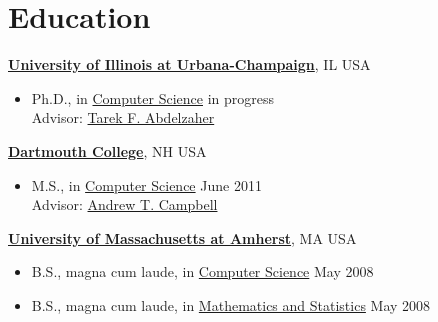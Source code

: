 \section{\sc Education}
{\href{http://www.illinois.edu/}{{\bf University of Illinois at Urbana-Champaign}}}, IL USA
\begin{itemize}
\item Ph.D., in {\href{http://www.cs.illinois.edu/}{Computer Science}} \hfill in progress \\
Advisor: {\href{http://www.cs.uiuc.edu/~zaher/}{Tarek F. Abdelzaher}}
\end{itemize}

{\href{http://www.dartmouth.edu/}{\bf Dartmouth College}}, NH USA
\begin{itemize}
\item M.S., in {\href{http://www.cs.dartmouth.edu/}{Computer Science}} \hfill June 2011 \\
Advisor: {\href{http://www.cs.dartmouth.edu/~campbell}{Andrew T. Campbell}}
\end{itemize}

{\href{http://www.umass.edu/}{\bf University of Massachusetts at Amherst}}, MA USA
\begin{itemize}
\item B.S., magna cum laude, in {\href{http://www.cs.umass.edu/}{Computer Science}} \hfill May 2008\vspace{-1.6mm}
\item B.S., magna cum laude, in {\href{http://www.math.umass.edu/}{Mathematics and Statistics}}
 \hfill May 2008
\end{itemize}
